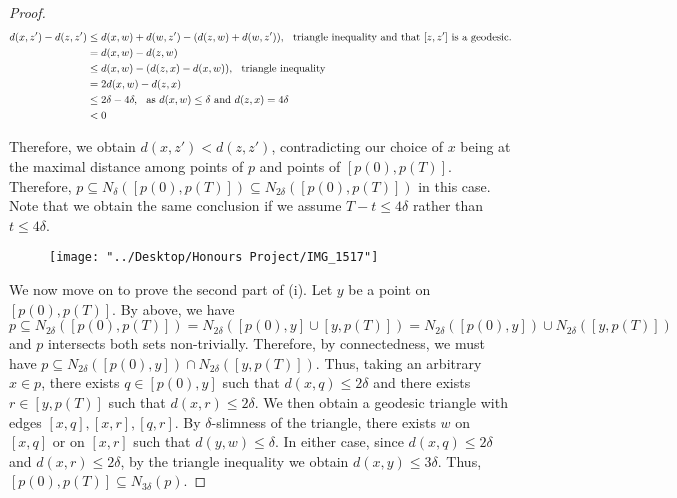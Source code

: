 \documentclass[12pt]{article}
\newcommand{\vs}{\vskip10pt}
\begin{document}
\begin{proof}
		\begin{align*}
		d(x, z') - d(z, z') &\leq d(x,w) + d(w,z') - (d(z, w) + d(w, z')), \hspace{0.25cm} \text{triangle inequality and that } [z,z'] \text{ is a geodesic}. \\
		&= d(x,w) - d(z, w) \\
		&\leq d(x,w) - (d(z,x) - d(x,w)), \hspace{0.25cm} \text{triangle inequality} \\
		&= 2d(x,w) - d(z,x) \\
		&\leq 2 \delta - 4 \delta, \hspace{0.25cm} \text{as } d(x,w) \leq \delta \text{ and } d(z,x) = 4 \delta \\
		&< 0
		\end{align*} 
		
		Therefore, we obtain $d(x, z') < d(z,z')$, contradicting our choice of $x$ being at the maximal distance among points of $p$ and points of $[p(0), p(T)]$. Therefore, $p \subseteq N_{\delta}([p(0), p(T)]) \subseteq N_{2 \delta}([p(0), p(T)]) $ in this case. Note that we obtain the same conclusion if we assume $T - t \leq 4 \delta$ rather than $t \leq 4 \delta$. 
	
\begin{figure} [h]
	\centering
	\texttt{[image: "../Desktop/Honours Project/IMG\_1517"]}
	\caption{}
	\label{fig:img1517}
\end{figure}
		
		\vs 
		
		We now move on to prove the second part of (i). Let $y$ be a point on $[p(0), p(T)]$. By above, we have $p \subseteq N_{2 \delta}([p(0), p(T)]) = N_{2 \delta} ([p(0), y] \cup [y, p(T)]) = N_{2 \delta} ([p(0), y]) \cup N_{2 \delta} ([y, p(T)])$ and $p$ intersects both sets non-trivially. Therefore, by connectedness, we must have $p \subseteq N_{2 \delta} ([p(0), y]) \cap N_{2 \delta} ([y, p(T)])$. Thus, taking an arbitrary $x \in p$, there exists $q \in [p(0), y]$ such that $d(x, q) \leq 2 \delta$ and there exists $r \in [y, p(T)]$ such that $d(x, r) \leq 2 \delta$. We then obtain a geodesic triangle with edges $[x, q], [x, r], [q,r]$. By $\delta$-slimness of the triangle, there exists $w$ on $[x, q]$ or on $[x,r]$ such that $d(y, w) \leq \delta$. In either case, since $d(x, q) \leq 2 \delta$ and $d(x, r) \leq 2 \delta$, by the triangle inequality we obtain $d(x, y) \leq 3 \delta$. Thus, $[p(0), p(T)] \subseteq N_{3 \delta}(p)$. 
		

\end{proof}
\end{document}
